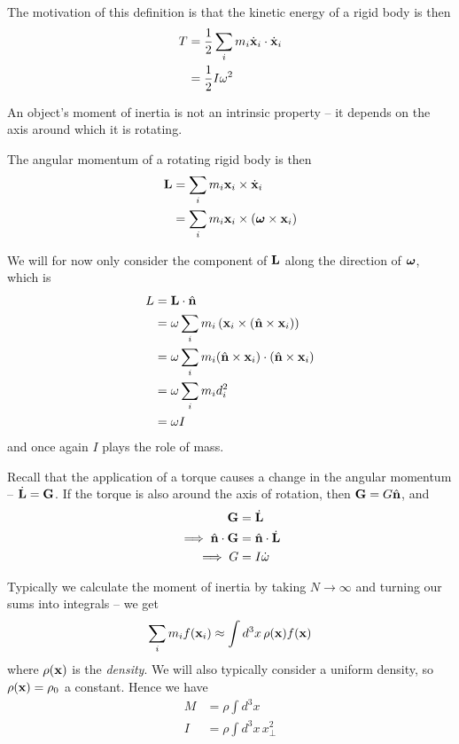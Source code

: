 \documentclass{../template/note}
\begin{document}
    The motivation of this definition is that the kinetic energy of a rigid body is then
    \begin{align*}
        T &= \frac 1 2 \sum_i m_i \dot{\V x}_i \cdot \dot{\V x}_i \\
        &= \frac 1 2 I \omega^2
    \end{align*}

    \begin{remark*}
        An object's moment of inertia is not an intrinsic property -- it depends on the axis around which it is rotating.
    \end{remark*}

    The angular momentum of a rotating rigid body is then
    \begin{align*}
        \V L &= \sum_i m_i \V x_i \times \dot{\V x}_i \\
        &= \sum_i m_i \V x_i \times (\V \omega \times \V x_i)
    \end{align*}
    
    We will for now only consider the component of \(\V L\) along the direction of \(\V \omega\), which is
    \begin{align*}
        L &= \V L \cdot \hvec n \\
        &= \omega \sum_i m_i \left(\V x_i \times (\hvec n \times \V x_i)\right) \\
        &= \omega \sum_i m_i (\hvec n \times \V x_i) \cdot (\hvec n \times \V x_i) \\
        &= \omega \sum_i m_i d_i^2 \\
        &= \omega I
    \end{align*}
    and once again \(I\) plays the role of mass.

    Recall that the application of a torque causes a change in the angular momentum -- \(\dot{\V L} = \V G\). If the torque is also around the axis of rotation, then \(\V G = G \hvec n\), and
    \begin{align*}
        \V G &= \dot{\V L} \\
        \implies \hvec n \cdot \V G &= \hvec n \cdot \dot{\V L} \\
        \implies G &= I \dot{\omega}
    \end{align*}
    
    Typically we calculate the moment of inertia by taking \(N \to \infty\) and turning our sums into integrals -- we get
    \begin{align*}
        \sum_i m_i f(\V x_i) \approx \int d^3x \, \rho(\V x) f(\V x)
    \end{align*}
    where \(\rho(\V x)\) is the \emph{density}. We will also typically consider a uniform density, so \(\rho(\V x) = \rho_0\) a constant. Hence we have
    \begin{align*}
        M &= \rho \int d^3x \, \\
        I &= \rho \int d^3x \, x_\perp^2
    \end{align*}
    
\end{document}
